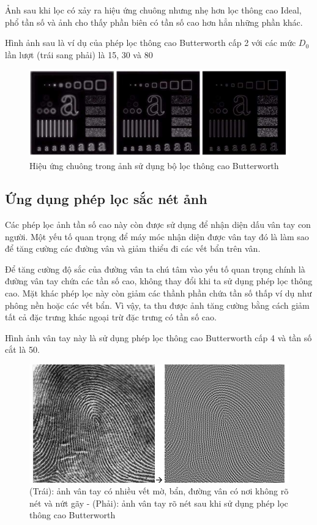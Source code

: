 \documentclass[12pt,a4paper]{report}
\numberwithin{equation}{section}
\theoremstyle{definition} %
\begin{document}
Ảnh sau khi lọc có xảy ra hiệu ứng chuông nhưng nhẹ hơn lọc thông cao Ideal, phổ tần số và ảnh cho thấy phần biên có tần số cao hơn hẳn những phần khác.

Hình ảnh sau là ví dụ của phép lọc thông cao Butterworth cấp 2 với các mức $D_0$ lần lượt (trái sang phải) là 15, 30 và 80

\begin{figure}[H]
\centering
\includegraphics[width=0.8\linewidth]{img/butterworthhighpass/vidu.png}
\caption{Hiệu ứng chuông trong ảnh sử dụng bộ lọc thông cao Butterworth}
\label{fig139}
\end{figure}

\subsection{Ứng dụng phép lọc sắc nét ảnh}
Các phép lọc ảnh tần số cao này còn được sử dụng để nhận diện dấu vân tay con người. Một yếu tố quan trọng để máy móc nhận diện được vân tay đó là làm sao để tăng cường các đường vân và giảm thiểu đi các vết bẩn trên vân. 

Để tăng cường độ sắc của đường vân ta chú tâm vào yếu tố quan trọng chính là đường vân tay chứa các tần số cao, không thay đổi khi ta sử dụng phép lọc thông cao. Mặt khác phép lọc này còn giảm các thầnh phần chứa tần số thấp ví dụ như phông nền hoặc các vết bẩn. Vì vậy, ta thu được ảnh tăng cường bằng cách giảm tất cả đặc trưng khác ngoại trừ đặc trưng có tần số cao.

Hình ảnh vân tay này là sử dụng phép lọc thông cao Butterworth cấp 4 và tần số cắt là 50.

\begin{figure}[H]
	\centering
	\includegraphics[width=0.88\linewidth]{img/ungdungsacanh/vantay.png}
	\caption{(Trái): ảnh vân tay có nhiều vết mờ, bẩn, đường vân có nơi không rõ nét và nứt gãy - (Phải): ảnh vân tay rõ nét sau khi sử dụng  phép lọc thông cao Butterworth}
	\label{fig140}
\end{figure}
\end{document}
